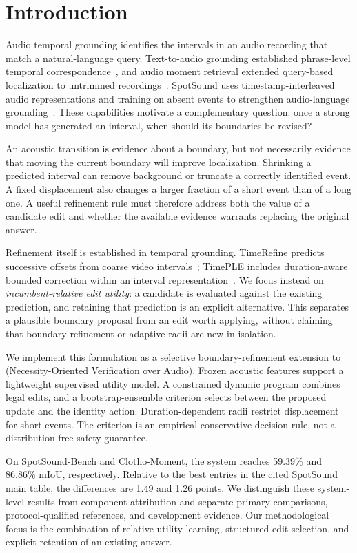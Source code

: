 \section{Introduction}
\label{sec:intro}
Audio temporal grounding identifies the intervals in an audio recording that match a natural-language query. Text-to-audio grounding established phrase-level temporal correspondence~\cite{xu2021grounding}, and audio moment retrieval extended query-based localization to untrimmed recordings~\cite{munakata2025amr}. SpotSound uses timestamp-interleaved audio representations and training on absent events to strengthen audio-language grounding~\cite{sun2026spotsound}. These capabilities motivate a complementary question: once a strong model has generated an interval, when should its boundaries be revised?

An acoustic transition is evidence about a boundary, but not necessarily evidence that moving the current boundary will improve localization. Shrinking a predicted interval can remove background or truncate a correctly identified event. A fixed displacement also changes a larger fraction of a short event than of a long one. A useful refinement rule must therefore address both the value of a candidate edit and whether the available evidence warrants replacing the original answer.

Refinement itself is established in temporal grounding. TimeRefine predicts successive offsets from coarse video intervals~\cite{wang2024timerefine}; TimePLE includes duration-aware bounded correction within an interval representation~\cite{zeng2026timeple}. We focus instead on \emph{incumbent-relative edit utility}: a candidate is evaluated against the existing prediction, and retaining that prediction is an explicit alternative. This separates a plausible boundary proposal from an edit worth applying, without claiming that boundary refinement or adaptive radii are new in isolation.

We implement this formulation as a selective boundary-refinement extension to \NOVA{} (Necessity-Oriented Verification over Audio). Frozen acoustic features support a lightweight supervised utility model. A constrained dynamic program combines legal edits, and a bootstrap-ensemble criterion selects between the proposed update and the identity action. Duration-dependent radii restrict displacement for short events. The criterion is an empirical conservative decision rule, not a distribution-free safety guarantee.

On SpotSound-Bench and Clotho-Moment, the system reaches 59.39\% and 86.86\% mIoU, respectively. Relative to the best entries in the cited SpotSound main table, the differences are 1.49 and 1.26 points. We distinguish these system-level results from component attribution and separate primary comparisons, protocol-qualified references, and development evidence. Our methodological focus is the combination of relative utility learning, structured edit selection, and explicit retention of an existing answer.
